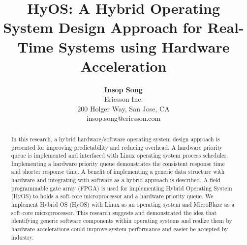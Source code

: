 \documentclass[10pt,a4paper]{article}
\title{\LARGE
HyOS: A Hybrid Operating System Design Approach for Real-Time Systems using Hardware Acceleration
}
\author{\large
{\bf Insop Song }\\ 
Ericsson Inc.\\
200 Holger Way, San Jose, CA\\
\vspace{8mm}
insop.song$@$ericsson.com\\
}
\date{}
\begin{document}
\maketitle

\begin{abstract}
In this research, a hybrid hardware/software operating system design approach is presented for improving predictability and reducing overhead. A hardware priority queue is implemented and interfaced with Linux operating system process scheduler. Implementing a hardware priority queue demonstrates the consistent response time and shorter response time. A benefit of implementing a generic data structure with hardware and integrating with software as a hybrid approach is described. A field programmable gate array (FPGA) is used for implementing Hybrid Operating System (HyOS) to holds a soft-core microprocessor and a hardware priority queue. We implement Hybrid OS (HyOS) with Linux as an operating system and MicroBlaze as a soft-core microprocessor. This research suggests and demonstrated the idea that identifying generic software components within operating systems and realize them by hardware accelerations could improve system performance and easier be accepted by industry.

\end{abstract}

\vspace{10mm}
\end{document}
